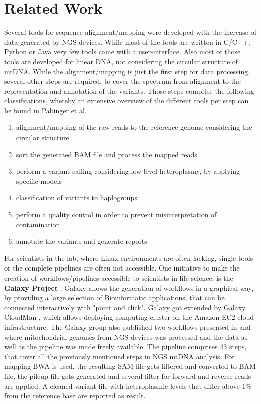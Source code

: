 \section{Related Work}
Several tools for sequence alignment/mapping were developed with the increase of data generated by NGS devices. While most of the tools are written in C/C++, Python or Java very few tools came with a user-interface. Also most of those tools are developed for linear DNA, not considering the circular structure of mtDNA. While the alignment/mapping is just the first step for data processing, several other steps are required, to cover the spectrum from alignment to the representation and annotation of the variants. Those steps comprise the following classifications, whereby an extensive overview of the different tools per step can be found in Pabinger et al. \cite{Pabinger2013}. 
\begin{enumerate}\label{enum:NGS}
\item alignment/mapping of the raw reads to the reference genome considering the circular structure
\item sort the generated BAM file and process the mapped reads
\item perform a variant calling considering low level heteroplasmy, by applying specific models
\item classification of variants to haplogroups
\item perform a quality control in order to prevent misinterpretation of contamination 
\item annotate the variants and generate reports
\end{enumerate}

For scientists in the lab, where Linux-environments are often lacking, single tools or the complete pipelines are often not accessible. One initiative to make the creation of workflows/pipelines accessible to scientists in life science, is the \textbf{Galaxy Project} \cite{Goecks2010,Afgan2016}. Galaxy allows the generation of workflows in a graphical way, by providing a large selection of Bioinformatic applications, that can be connected interactively with "point and click". Galaxy got extended by Galaxy CloudMan \cite{Afgan2010}, which allows deploying computing cluster on the Amazon EC2 cloud infrastructure. The Galaxy group also published two workflows presented in \cite{Goto2011} and \cite{Dickins2014} where mitochondrial genomes from NGS devices was processed and the data as well as the pipeline was made freely available. The pipeline comprises 43 steps, that cover all the previously mentioned steps in NGS mtDNA analysis. For mapping BWA is used, the resulting SAM file gets filtered and converted to BAM file, the pileup file gets generated and several filter for forward and reverse reads are applied. A cleaned variant file with heteroplasmic levels that differ above 1\% from the reference base are reported as result.


